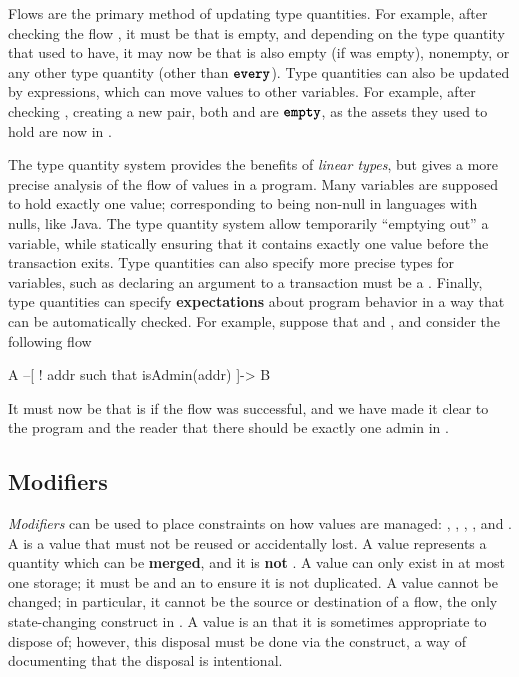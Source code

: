 \documentclass[dvipsnames, usenames, sigconf]{acmart}
\begin{document}
Flows are the primary method of updating type quantities.
For example, after checking the flow , it must be that  is empty, and depending on the type quantity that  used to have, it may now be that  is also empty (if  was empty), nonempty, or any other type quantity (other than $\textbf{\texttt{every}}$).
Type quantities can also be updated by expressions, which can move values to other variables.
For example, after checking , creating a new pair, both  and  are $\textbf{\texttt{empty}}$, as the assets they used to hold are now in .

The type quantity system provides the benefits of \emph{linear types}, but gives a more precise analysis of the flow of values in a program.
Many variables are supposed to hold exactly one value; corresponding to being non-null in languages with nulls, like Java.
The type quantity system allow temporarily ``emptying out'' a variable, while statically ensuring that it contains exactly one value before the transaction exits.
Type quantities can also specify more precise types for variables, such as declaring an argument to a transaction must be a .
Finally, type quantities can specify \textbf{expectations} about program behavior in a way that can be automatically checked.
For example, suppose that  and , and consider the following flow
\begin{flow}
A --[ ! addr such that isAdmin(addr) ]-> B
\end{flow}
It must now be that  is  if the flow was successful, and we have made it clear to the program and the reader that there should be exactly one admin in .

\subsection{Modifiers}\label{sec:lang-modifiers}
\emph{Modifiers} can be used to place constraints on how values are managed: , , , , and .
A  is a value that must not be reused or accidentally lost.
A  value represents a quantity which can be \textbf{merged}, and it is \textbf{not} .
A  value can only exist in at most one storage; it must be  and an  to ensure it is not duplicated.
A  value cannot be changed; in particular, it cannot be the source or destination of a flow, the only state-changing construct in \langName.
A  value is an  that it is sometimes appropriate to dispose of; however, this disposal must be done via the  construct, a way of documenting that the disposal is intentional.
\end{document}
